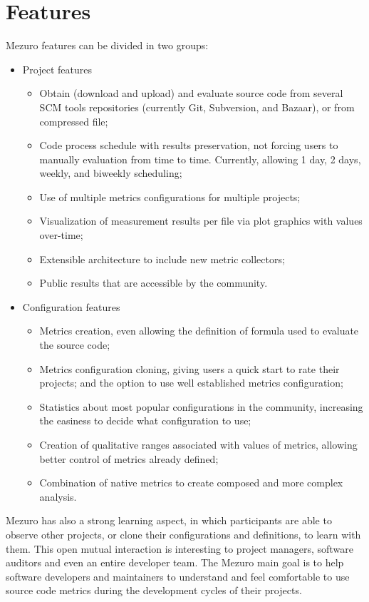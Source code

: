 \section{Features}
\label{sec:features}

Mezuro features can be divided in two groups:

\begin{itemize}
    \item Project features
    \begin{itemize}
        \item Obtain (download and upload) and evaluate source code from
            several SCM tools repositories (currently Git, Subversion, and
            Bazaar), or from compressed file;
        \item Code process schedule with results preservation, not forcing
            users to manually evaluation from time to time. Currently,
            allowing 1 day, 2 days, weekly, and biweekly scheduling;
        \item Use of multiple metrics configurations for multiple projects;
        \item Visualization of measurement results per file via plot graphics
            with values over-time;
        \item Extensible architecture to include new metric collectors;
        \item Public results that are accessible by the community.
    \end{itemize}

    \item Configuration features
    \begin{itemize}
        \item Metrics creation, even allowing the definition of formula used to
            evaluate the source code;
        \item Metrics configuration cloning, giving users a quick start to rate
            their projects; and the option to use well established metrics
            configuration;
        \item Statistics about most popular configurations in the community,
            increasing the easiness to decide what configuration to use;
        \item Creation of qualitative ranges associated with values of metrics,
            allowing better control of metrics already defined;
        \item Combination of native metrics to create composed and more complex
            analysis.
    \end{itemize}
\end{itemize}

Mezuro has also a strong learning aspect, in which participants are able to
observe other projects, or clone their configurations and definitions, to learn
with them.  This open mutual interaction is interesting to project managers,
software auditors and even an entire developer team. The Mezuro main goal is to
help software developers and maintainers to understand and feel comfortable to
use source code metrics during the development cycles of their projects.


